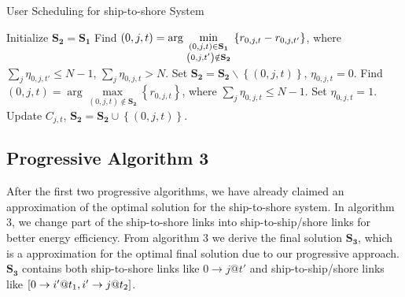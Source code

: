 \documentclass[conference]{IEEEtran}
\begin{document}
\begin{algorithm}[h]
\caption{User Scheduling for ship-to-shore System}
\begin{algorithmic}[1]
\STATE Initialize ${{\mathbf{S}}_{\mathbf{2}}}={{\mathbf{S}}_{\mathbf{1}}}$
  \STATE Find $\left( {0,j,t} \right) = \arg \mathop {\min }\limits_{\scriptstyle \left( {0,j,t} \right) \in {{\mathbf{S}}_{\mathbf{1}}} \atop
  \scriptstyle \left( {0,j,t'} \right) \notin {{\mathbf{S}}_{\mathbf{2}}}}  \left\{ {{r_{0,j,t}} - {r_{0,j,t'}}} \right\}$, where $\sum\limits_{j} {{\eta _{0,j,t'}}}  \le N - 1$, $\sum\limits_j {{\eta _{0,j,t}} > N} $.
  \STATE Set ${{\mathbf{S}}_{\mathbf{2}}}={{\mathbf{S}}_{\mathbf{2}}}\backslash \left\{ {\left( {0,j,t} \right)} \right\}$, ${\eta _{0,j,t}} = 0$.
    \STATE Find ${\left( {0,j,t} \right) = \arg \mathop {\max }\limits_{\left( {0,j,t} \right) \notin {{\mathbf{S}}_{\mathbf{2}}}} \left\{ {{r_{0,j,t}}} \right\}}$, where ${\sum\limits_j {{\eta _{0,j,t}}}  \le N - 1}$.
    \STATE Set ${\eta _{0,j,t}} = 1$.
    \STATE Update ${C_{j,t}}$, ${{\mathbf{S}}_{\mathbf{2}}}={{\mathbf{S}}_{\mathbf{2}}} \cup \left\{ {\left( {0,j,t} \right)} \right\}$.
  \ENDWHILE
\ENDWHILE
\end{algorithmic}
\end{algorithm}

\subsection{Progressive Algorithm 3}

After the first two progressive algorithms, we have already claimed an approximation of the optimal solution for the ship-to-shore system. 
In algorithm 3, we change part of the ship-to-shore links into ship-to-ship/shore links for better energy efficiency. From algorithm 3 we derive the final solution ${{\mathbf{S}}_{\mathbf{3}}}$, which is a approximation for the optimal final solution due to our progressive approach. ${{\mathbf{S}}_{\mathbf{3}}}$ contains both ship-to-shore links like $0 \to j@t'$ and ship-to-ship/shore links like $\left[ {{\rm{0}} \to i'@{t_1},i' \to j@{t_2}} \right]$.
\end{document}
